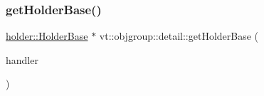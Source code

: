 \subsubsection{\texorpdfstring{get\+Holder\+Base()}{getHolderBase()}}
{\footnotesize\ttfamily \hyperlink{structvt_1_1objgroup_1_1holder_1_1_holder_base}{holder\+::\+Holder\+Base} $\ast$ vt\+::objgroup\+::detail\+::get\+Holder\+Base (\begin{DoxyParamCaption}\item[{\hyperlink{namespacevt_af64846b57dfcaf104da3ef6967917573}{Handler\+Type}}]{handler }\end{DoxyParamCaption})}

